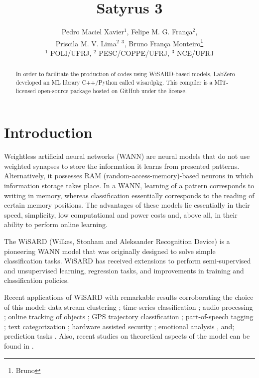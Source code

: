 \documentclass[12pt]{article}
\title{Satyrus 3}
\author{Pedro Maciel Xavier$^1$, Felipe M. G. França$^2$,\\ Priscila M. V. Lima$^2$ $^3$, Bruno França Monteiro\footnote{Bruno}\\
$^1$ POLI/UFRJ, $^2$ PESC/COPPE/UFRJ, $^3$ NCE/UFRJ}
\begin{document}
\nocite{*}

\maketitle

\begin{abstract}
    In order to facilitate the production of codes using WiSARD-based models, LabZero developed an ML library C++/Python called wisardpkg. This compiler is a MIT-licensed open-source package hosted on GitHub under the license.
\end{abstract}

\section{Introduction}

Weightless  artificial  neural  networks  (WANN)  are  neural  models
that  do  not  use weighted synapses to store the information it learns from presented patterns. Alternatively, it possesses RAM (random-access-memory)-based neurons in which information storage takes place. In a WANN, learning of a pattern corresponds to writing in memory, whereas classification essentially corresponds to the reading of certain memory positions. The advantages of these models lie essentially in their speed, simplicity, low computational and power costs and, above all, in their ability to perform online learning.

The WiSARD (Wilkes, Stonham and Aleksander Recognition Device) \cite{aleksander} is a pioneering WANN model that was originally designed to solve simple classification tasks. WiSARD has received extensions to perform semi-supervised and unsupervised learning, regression tasks, and improvements in training and classification policies.

Recent applications of WiSARD with remarkable results corroborating the choice of this model: data stream clustering \cite{douglas, douglas2, douglas3}; time-series classification \cite{souza2014}; audio processing \cite{souza2015}; online tracking of objects \cite{nascimento2015}; GPS trajectory classification \cite{barbosa2018}; part-of-speech tagging \cite{carneiro2015, carneiro2017}; text categorization \cite{rangel2016}; hardware assisted security \cite{santiago2019}; emotional analysis \cite{vidal2013, lusquinofilho2018, aus, empathy}, and; prediction tasks \cite{rew, lusquino2020}. Also, recent studies on theoretical aspects of the model can be found in \cite{carneiro2019}.
\end{document}
